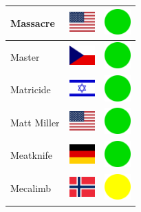 \documentclass[12pt, a4paper, twoside]{report}
\begin{document}
\begin{center}
\begin{longtable}{|p{5cm}|p{2cm}|p{2cm}|}
 Massacre                                                   & \includegraphics[width=1cm]{4x3/us} &   \includegraphics[width=1cm]{likes/y} \\ \hline
 Master                                                     & \includegraphics[width=1cm]{4x3/cz} &   \includegraphics[width=1cm]{likes/y} \\ \hline
 Matricide                                                  & \includegraphics[width=1cm]{4x3/il} &   \includegraphics[width=1cm]{likes/y} \\ \hline
 Matt Miller                                                & \includegraphics[width=1cm]{4x3/us} &   \includegraphics[width=1cm]{likes/y} \\ \hline
 Meatknife                                                  & \includegraphics[width=1cm]{4x3/de} &   \includegraphics[width=1cm]{likes/y} \\ \hline
 Mecalimb                                                   & \includegraphics[width=1cm]{4x3/no} &   \includegraphics[width=1cm]{likes/m} \\ \hline

\end{longtable}
\end{center}
\end{document}
